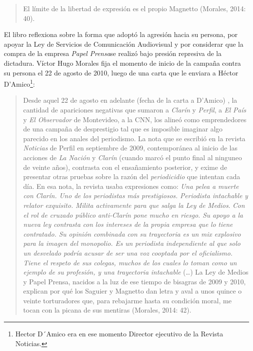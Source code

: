 {\begin{quote}
El límite de la libertad de expresión es el propio Magnetto (Morales, 2014: 40).
\end{quote}

El libro reflexiona sobre la forma que adoptó la agresión hacia su persona, por apoyar la Ley de Servicios de Comunicación Audiovisual y por considerar que la compra de la empresa \emph{Papel Prensa}se realizó bajo presión represiva de la dictadura. Víctor Hugo Morales fija el momento de inicio de la campaña contra su persona el 22 de agosto de 2010, luego de una carta que le enviara a Héctor D'Amico\footnote{Hector D´Amico era en ese momento Director ejecutivo de la Revista Noticias.}:

\begin{quote}
Desde aquel 22 de agosto en adelante (fecha de la carta a D'Amico) , la cantidad de apariciones negativas que sumaron a \emph{Clarín} y \emph{Perfil}, a \emph{El País} y \emph{El Observador} de Montevideo, a la CNN, los alineó como emprendedores de una campaña de desprestigio tal que es imposible imaginar algo parecido en los anales del periodismo. La nota que se escribió en la revista \emph{Noticias} de Perfil en septiembre de 2009, contemporánea al inicio de las acciones de \emph{La Nación} y \emph{Clarín} (cuando marcó el punto final al ninguneo de veinte años), contrasta con el ensañamiento posterior, y exime de presentar otras pruebas sobre la razón del \emph{periodicidio} que intentan cada día. En esa nota, la revista usaba expresiones como: \emph{Una pelea a muerte con Clarín. Uno de los periodistas más prestigiosos. Periodista intachable y relator exquisito. Milita activamente para que salga la Ley de Medios}. \emph{Con el rol de cruzado público anti-Clarín pone mucho en riesgo. Su apoyo a la nueva ley contrasta con los intereses de la propia empresa que lo tiene contratado. Su opinión combinada con su trayectoria es un mix explosivo para la imagen del monopolio. Es un periodista independiente al que solo un desvelado podría acusar de ser una voz cooptada por el oficialismo. Tiene el respeto de sus colegas, muchos de los cuales lo toman como un ejemplo de su profesión, y una trayectoria intachable} (\ldots) La Ley de Medios y Papel Prensa, nacidos a la luz de ese tiempo de bisagras de 2009 y 2010, explican por qué los Saguier y Magnetto dan letra y aval a unos quince o veinte torturadores que, para rebajarme hasta su condición moral, me tocan con la picana de sus mentiras (Morales, 2014: 42).
\end{quote}

}
